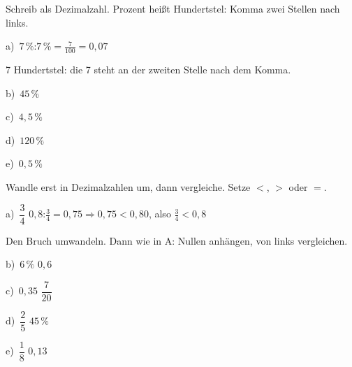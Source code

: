 \documentclass[11pt]{article}
\providecommand{\grau}[1]{{\color{mbgrau}#1}}
\newcommand{\aufg}[3]{\par\noindent\makebox[0pt][r]{#3}\begin{minipage}[t]{\linewidth}#1\end{minipage}\par}
\newcommand{\nr}[1]{\makebox[7mm][l]{\textbf{#1}}}
\begin{document}
\aufg{\nr{2.}\begin{minipage}[t]{\dimexpr\linewidth-7mm\relax}Schreib als Dezimalzahl. Prozent heißt Hundertstel: Komma zwei Stellen nach links.\par\smallskip
\grau{a)\ $7\,\%$:\quad $7\,\% = \frac{7}{100} = 0{,}07$}\par{\small 7 Hundertstel: die 7 steht an der zweiten Stelle nach dem Komma.}\par\medskip
\noindent\begin{minipage}[t]{0.48\linewidth}\raggedright
b)\ $45\,\%$
\end{minipage}\hfill
\begin{minipage}[t]{0.48\linewidth}\raggedright
c)\ $4{,}5\,\%$
\end{minipage}\par\smallskip
\noindent\begin{minipage}[t]{0.48\linewidth}\raggedright
d)\ $120\,\%$
\end{minipage}\hfill
\begin{minipage}[t]{0.48\linewidth}\raggedright
e)\ $0{,}5\,\%$
\end{minipage}\par\smallskip\end{minipage}}{}{}
\medskip
\aufg{\nr{3.}\begin{minipage}[t]{\dimexpr\linewidth-7mm\relax}Wandle erst in Dezimalzahlen um, dann vergleiche. Setze $<$, $>$ oder $=$.\par\smallskip
\grau{a)\ $\dfrac{3}{4}$ \fbox{\phantom{$<$}} $0{,}8$:\quad $\frac{3}{4} = 0{,}75$\quad$\Rightarrow$\quad $0{,}75 < 0{,}80$, also $\frac{3}{4} < 0{,}8$}\par{\small Den Bruch umwandeln. Dann wie in A: Nullen anhängen, von links vergleichen.}\par\medskip
\noindent\begin{minipage}[t]{0.48\linewidth}\raggedright
b)\ $6\,\%$ \fbox{\phantom{$<$}} $0{,}6$
\end{minipage}\hfill
\begin{minipage}[t]{0.48\linewidth}\raggedright
c)\ $0{,}35$ \fbox{\phantom{$<$}} $\dfrac{7}{20}$
\end{minipage}\par\smallskip
\noindent\begin{minipage}[t]{0.48\linewidth}\raggedright
d)\ $\dfrac{2}{5}$ \fbox{\phantom{$<$}} $45\,\%$
\end{minipage}\hfill
\begin{minipage}[t]{0.48\linewidth}\raggedright
e)\ $\dfrac{1}{8}$ \fbox{\phantom{$<$}} $0{,}13$
\end{minipage}\par\smallskip\end{minipage}}{}{{\scriptsize\color{mbgrau}Ziel\hspace{2mm}}}
\end{document}
